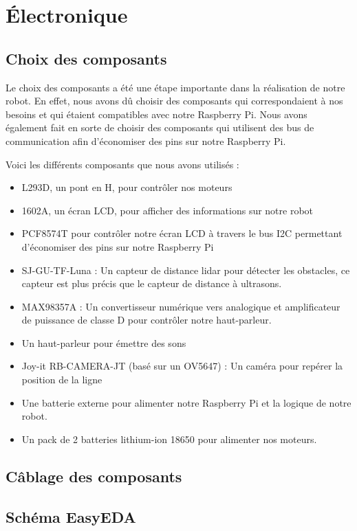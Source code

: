\section{Électronique}

\subsection{Choix des composants}

Le choix des composants a été une étape importante dans la réalisation de notre robot.
En effet, nous avons dû choisir des composants qui correspondaient à nos besoins et qui étaient compatibles avec notre Raspberry Pi. 
Nous avons également fait en sorte de choisir des composants qui utilisent des bus de communication afin d'économiser des pins sur notre Raspberry Pi.

Voici les différents composants que nous avons utilisés :
\begin{itemize}
    \item L293D, un pont en H, pour contrôler nos moteurs
    \item 1602A, un écran LCD, pour afficher des informations sur notre robot
    \item PCF8574T pour contrôler notre écran LCD à travers le bus I2C permettant d'économiser des pins sur notre Raspberry Pi
    \item SJ-GU-TF-Luna : Un capteur de distance lidar pour détecter les obstacles, ce capteur est plus précis que le capteur de distance à ultrasons.
    \item MAX98357A : Un convertisseur numérique vers analogique et amplificateur de puissance de classe D pour contrôler notre haut-parleur.
    \item Un haut-parleur pour émettre des sons
    \item Joy-it RB-CAMERA-JT (basé sur un OV5647) : Un caméra pour repérer la position de la ligne
    \item Une batterie externe pour alimenter notre Raspberry Pi et la logique de notre robot.
    \item Un pack de 2 batteries lithium-ion 18650 pour alimenter nos moteurs.
\end{itemize}

\subsection{Câblage des composants}

\todo

\subsection{Schéma EasyEDA}

\todo